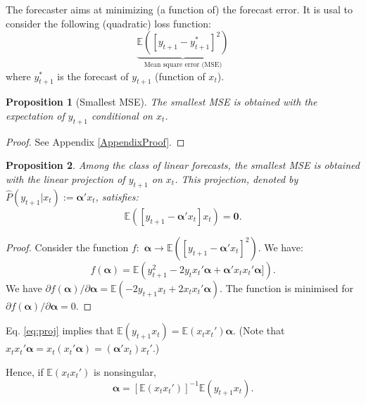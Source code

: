 \documentclass[
  12pt,
]{book}
\newtheorem{proposition}{Proposition}[chapter]
\theoremstyle{definition}
\theoremstyle{definition}
\theoremstyle{definition}
\theoremstyle{definition}
\theoremstyle{remark}
\begin{document}
The forecaster aims at minimizing (a function of) the forecast error. It is usal to consider the following (quadratic) loss function:
\[
\underbrace{\mathbb{E}([y_{t+1} - y^*_{t+1}]^2)}_{\mbox{Mean square error (MSE)}}
\]
where \(y^*_{t+1}\) is the forecast of \(y_{t+1}\) (function of \(x_t\)).

\begin{proposition}[Smallest MSE]
\protect\hypertarget{prp:smallestMSE}{}\label{prp:smallestMSE}The smallest MSE is obtained with the expectation of \(y_{t+1}\) conditional on \(x_t\).
\end{proposition}

\begin{proof}
See Appendix \ref{AppendixProof}.
\end{proof}

\begin{proposition}
\protect\hypertarget{prp:smallestMSElinear}{}\label{prp:smallestMSElinear}Among the class of linear forecasts, the smallest MSE is obtained with the linear projection of \(y_{t+1}\) on \(x_t\).
This projection, denoted by \(\hat{P}(y_{t+1}|x_t):=\boldsymbol\alpha'x_t\), satisfies:
\begin{equation}
\mathbb{E}\left( [y_{t+1} - \boldsymbol\alpha'x_t]x_t \right)=\mathbf{0}.\label{eq:proj}
\end{equation}
\end{proposition}

\begin{proof}
Consider the function \(f:\) \(\boldsymbol\alpha \rightarrow \mathbb{E}\left( [y_{t+1} - \boldsymbol\alpha'x_t]^2 \right)\). We have:
\[
f(\boldsymbol\alpha) = \mathbb{E}\left( y_{t+1}^2 - 2 y_t x_t'\boldsymbol\alpha + \boldsymbol\alpha'x_t x_t'\boldsymbol\alpha] \right).
\]
We have \(\partial f(\boldsymbol\alpha)/\partial \boldsymbol\alpha = \mathbb{E}(-2 y_{t+1} x_t + 2 x_t x_t'\boldsymbol\alpha)\). The function is minimised for \(\partial f(\boldsymbol\alpha)/\partial \boldsymbol\alpha =0\).
\end{proof}

Eq. \eqref{eq:proj} implies that \(\mathbb{E}\left( y_{t+1}x_t \right)=\mathbb{E}\left(x_tx_t' \right)\boldsymbol\alpha\). (Note that \(x_t x_t'\boldsymbol\alpha=x_t (x_t'\boldsymbol\alpha)=(\boldsymbol\alpha'x_t) x_t'\).)

Hence, if \(\mathbb{E}\left(x_tx_t' \right)\) is nonsingular,
\begin{equation}
\boldsymbol\alpha=[\mathbb{E}\left(x_tx_t' \right)]^{-1}\mathbb{E}\left( y_{t+1}x_t \right).\label{eq:linproj}
\end{equation}
\end{document}
